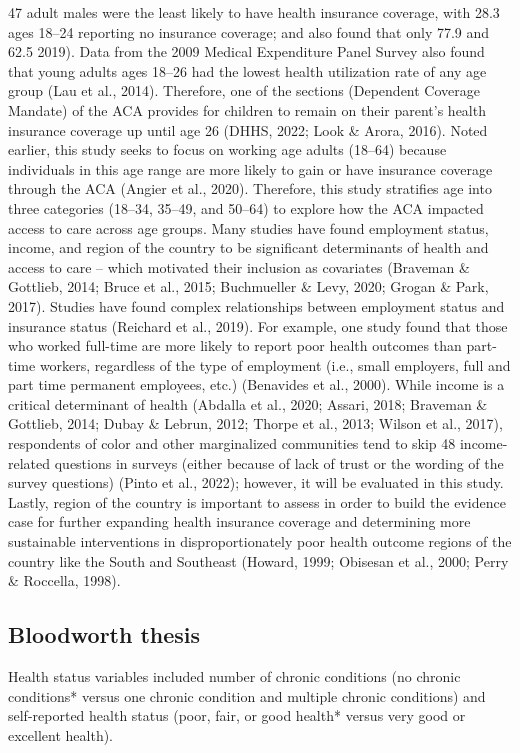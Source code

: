 \documentclass[../main.tex]{subfiles}
\begin{document}
47
adult males were the least likely to have health insurance coverage, with 28.3 %
ages 18–24 reporting no insurance coverage; and also found that only 77.9 %
and 62.5 %
2019). Data from the 2009 Medical Expenditure Panel Survey also found that young
adults ages 18–26 had the lowest health utilization rate of any age group (Lau et al.,
2014). Therefore, one of the sections (Dependent Coverage Mandate) of the ACA
provides for children to remain on their parent’s health insurance coverage up until age
26 (DHHS, 2022; Look \& Arora, 2016). Noted earlier, this study seeks to focus on
working age adults (18–64) because individuals in this age range are more likely to gain
or have insurance coverage through the ACA (Angier et al., 2020). Therefore, this study
stratifies age into three categories (18–34, 35–49, and 50–64) to explore how the ACA
impacted access to care across age groups.
Many studies have found employment status, income, and region of the country to
be significant determinants of health and access to care – which motivated their inclusion
as covariates (Braveman \& Gottlieb, 2014; Bruce et al., 2015; Buchmueller \& Levy,
2020; Grogan \& Park, 2017). Studies have found complex relationships between
employment status and insurance status (Reichard et al., 2019). For example, one study
found that those who worked full-time are more likely to report poor health outcomes
than part-time workers, regardless of the type of employment (i.e., small employers, full
and part time permanent employees, etc.) (Benavides et al., 2000).
While income is a critical determinant of health (Abdalla et al., 2020; Assari,
2018; Braveman \& Gottlieb, 2014; Dubay \& Lebrun, 2012; Thorpe et al., 2013; Wilson
et al., 2017), respondents of color and other marginalized communities tend to skip 
48
income-related questions in surveys (either because of lack of trust or the wording of the
survey questions) (Pinto et al., 2022); however, it will be evaluated in this study. Lastly,
region of the country is important to assess in order to build the evidence case for further
expanding health insurance coverage and determining more sustainable interventions in
disproportionately poor health outcome regions of the country like the South and
Southeast (Howard, 1999; Obisesan et al., 2000; Perry \& Roccella, 1998). 

\subsection{Bloodworth thesis}
Health status variables included number of chronic conditions (no chronic conditions* versus one chronic condition and multiple chronic conditions) and self-reported health status (poor, fair, or good health* versus very good or excellent health).
\end{document}
